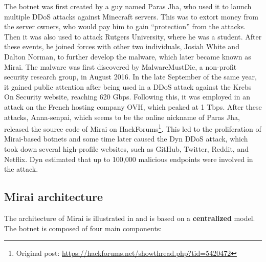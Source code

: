 The botnet was first created by a guy named Paras Jha, who used it to launch multiple DDoS attacks against Minecraft servers. This was to extort money from the server owners, who would pay him to gain ``protection'' from the attacks. Then it was also used to attack Rutgers University, where he was a student. After these events, he joined forces with other two individuals, Josiah White and Dalton Norman, to further develop the malware, which later became known as Mirai. The malware was first discovered by MalwareMustDie, a non-profit security research group, in August 2016. In the late September of the same year, it gained public attention after being used in a DDoS attack against the Krebs On Security website, reaching 620 Gbps. Following this, it was employed in an attack on the French hosting company OVH, which peaked at 1 Tbps. After these attacks, Anna-senpai, which seems to be the online nickname of Paras Jha, released the source code of Mirai on HackForums\footnote{Original post: \url{https://hackforums.net/showthread.php?tid=5420472}}. This led to the proliferation of Mirai-based botnets and some time later caused the Dyn DDoS attack, which took down several high-profile websites, such as GitHub, Twitter, Reddit, and Netflix. Dyn estimated that up to 100,000 malicious endpoints were involved in the attack. \cite{8115504}

\subsection{Mirai architecture}

The architecture of Mirai is illustrated in  and is based on a \textbf{centralized} model. The botnet is composed of four main components: 

